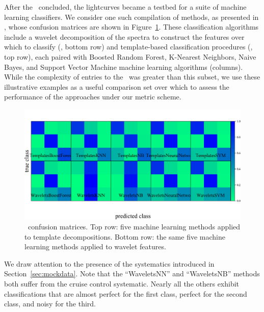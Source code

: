 After the \snphotcc\ concluded, the lightcurves became a testbed for a suite of machine learning classifiers.
We consider one such compilation of methods, as presented in \cite{lochner_photometric_2016}, whose confusion matrices are shown in Figure~\ref{fig:snphotcc_cm}.
These classification algorithms include a wavelet decomposition of the spectra to construct the features over which to classify (\citet{2011MNRAS.414.1987N}, bottom row) and template-based classification procedures (\citet{2011ApJ...738..162S}, top row), each paired with Boosted Random Forest, K-Nearest Neighbors, Naive Bayes, and Support Vector Machine machine learning algorithms (columns).
While the complexity of entries to the \snphotcc\ was greater than this subset, we use these illustrative examples as a useful comparison set over which to assess the performance of the approaches under our metric scheme.

\begin{figure}
	\begin{center}
    \includegraphics[width=\textwidth]{./fig/all_snphotcc_cm.png}
		\caption{\snphotcc\ confusion matrices.
    Top row: five machine learning methods applied to template decompositions.
    Bottom row: the same five machine learning methods applied to wavelet features.}
		\label{fig:snphotcc_cm}
	\end{center}
\end{figure}

We draw attention to the presence of the systematics introduced in Section~\ref{sec:mockdata}.
Note that the ``WaveletsNN'' and ``WaveletsNB'' methods both suffer from the cruise control systematic.
Nearly all the others exhibit classifications that are almost perfect for the first class, perfect for the second class, and noisy for the third.

%
